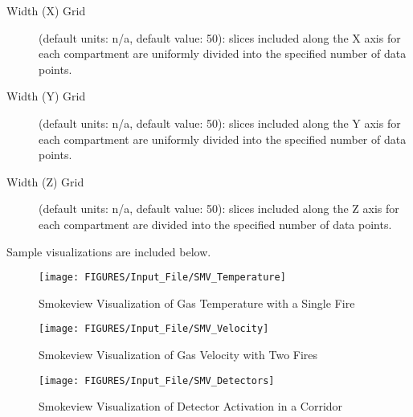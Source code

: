 \begin{description}
\item[Width (X) Grid] (default units: n/a, default value: 50): slices included along the X axis for each compartment are uniformly divided into the specified number of data points.

\item[Width (Y) Grid] (default units: n/a, default value: 50): slices included along the Y axis for each compartment are uniformly divided into the specified number of data points.

\item[Width (Z) Grid] (default units: n/a, default value: 50): slices included along the Z axis for each compartment are divided into the specified number of data points.
\end{description}

Sample visualizations are included below.

\begin{figure}[h!]
\begin{center}
\texttt{[image: FIGURES/Input\_File/SMV\_Temperature]}
\caption{Smokeview Visualization of Gas Temperature with a Single Fire}
\end{center}
\end{figure}

\begin{figure}[h!]
\begin{center}
\texttt{[image: FIGURES/Input\_File/SMV\_Velocity]}
\caption{Smokeview Visualization of Gas Velocity with Two Fires}
\end{center}
\end{figure}

\begin{figure}[h!]
\begin{center}
\texttt{[image: FIGURES/Input\_File/SMV\_Detectors]}
\caption{Smokeview Visualization of Detector Activation in a Corridor}
\end{center}
\end{figure}

